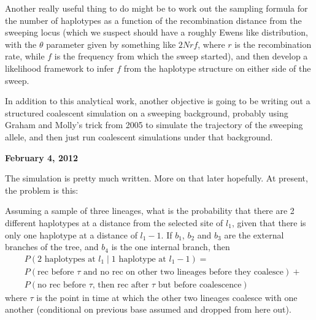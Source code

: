 \documentclass[reqno]{amsart}
\begin{document}
Another really useful thing to do might be to work out the sampling formula for the number of haplotypes as a function of the recombination distance from the sweeping locus (which we suspect should have a roughly Ewens like distribution, with the $\theta$ parameter given by something like $2Nrf$, where $r$ is the recombination rate, while $f$ is the frequency from which the sweep started), and then develop a likelihood framework to infer $f$ from the haplotype structure on either side of the sweep.

In addition to this analytical work, another objective is going to be writing out a structured coalescent simulation on a sweeping background, probably using Graham and Molly's trick from 2005\cite{Przeworski2005} to simulate the trajectory of the sweeping allele, and then just run coalescent simulations under that background.

\begin{flushright}
	\textbf{February 4, 2012}
\end{flushright}

The simulation is pretty much written. More on that later hopefully. At present, the problem is this: 

Assuming a sample of three lineages, what is the probability that there are 2 different haplotypes at a distance from the selected site of $l_1$, given that there is only one haplotype at a distance of $l_1-1$. If $b_1$, $b_2$ and $b_3$ are the external branches of the tree, and $b_4$ is the one internal branch, then
\begin{align}
	& P(\text{2 haplotypes at } l_1 \mid  \text{1 haplotype at } l_1-1) = \\
	& P(\text{rec before } \tau \text{ and no rec on other two lineages before they coalesce}) + \\
	& P(\text{no rec before }\tau \text{, then rec after } \tau \text{ but before coalescence})
\end{align}
where $\tau$ is the point in time at which the other two lineages coalesce with one another (conditional on previous base assumed and dropped from here out).
\end{document}
